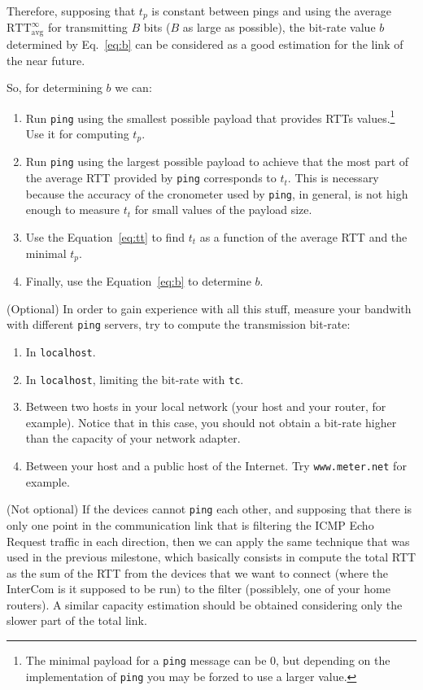 Therefore, supposing that $t_p$ is constant between pings and using
the average $\text{RTT}_{\text{avg}}^\infty$ for transmitting $B$ bits ($B$
as large as possible), the bit-rate value $b$ determined by
Eq.~\ref{eq:b} can be considered as a good estimation for the link of
the near future.

So, for determining $b$ we can:
\begin{enumerate}
\item Run \texttt{ping} using the smallest possible payload that
  provides RTTs values.\footnote{The minimal payload for a
    \texttt{ping} message can be 0, but depending on the
    implementation of \texttt{ping} you may be forzed to use a larger
    value.} Use it for computing $t_p$.
  
\item Run \texttt{ping} using the largest possible payload to achieve
  that the most part of the average RTT provided by \texttt{ping}
  corresponds to $t_t$. This is necessary because the accuracy of the
  cronometer used by \texttt{ping}, in general, is not high enough to
  measure $t_t$ for small values of the payload size.
  
\item Use the Equation~\ref{eq:tt} to find $t_t$ as a function of
  the average RTT and the minimal $t_p$.
  
\item Finally, use the Equation~\ref{eq:b} to determine $b$.
\end{enumerate}

(Optional) In order to gain experience with all this stuff, measure
your bandwith with different \texttt{ping} servers, try to compute the
transmission bit-rate:
\begin{enumerate}
\item In \texttt{localhost}.
\item In \texttt{localhost}, limiting the bit-rate with \texttt{tc}.
\item Between two hosts in your local network (your host and your
  router, for example). Notice that in this case, you should not
  obtain a bit-rate higher than the capacity of your network adapter.
\item Between your host and a public host of the Internet. Try
  \texttt{www.meter.net} for example.
\end{enumerate}

(Not optional) If the devices cannot \texttt{ping} each other, and
supposing that there is only one point in the communication link that
is filtering the ICMP Echo Request traffic in each direction, then we
can apply the same technique that was used in the previous milestone,
which basically consists in compute the total RTT as the sum of the
RTT from the devices that we want to connect (where the InterCom is it
supposed to be run) to the filter (possiblely, one of your home
routers). A similar capacity estimation should be obtained considering
only the slower part of the total link.

